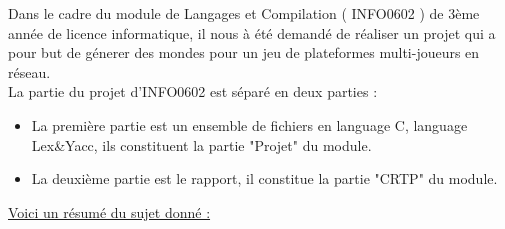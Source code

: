 Dans le cadre du module de Langages et Compilation ( INFO0602 ) de 3ème année de licence informatique, il nous à été demandé de réaliser un projet qui a pour but de génerer des mondes pour un jeu de plateformes multi-joueurs en réseau.
\\[1cm]
La partie du projet d'INFO0602 est séparé en deux parties :
\begin{itemize}
    \item La première partie est un ensemble de fichiers en language C, language Lex&Yacc, ils constituent la partie "Projet" du module.
    \item La deuxième partie est le rapport, il constitue la partie "CRTP" du module.\\[1cm]
\end{itemize}


\underline{Voici un résumé du sujet donné :}
\\[5mm]


\newpage
